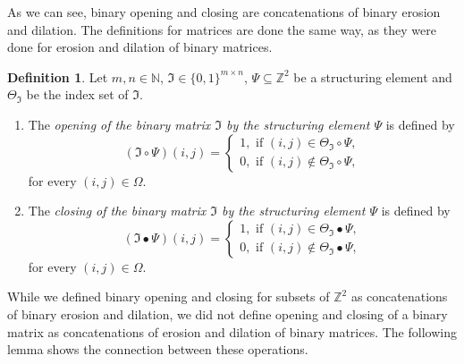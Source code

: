 \documentclass[a4paper,12pt]{article}
\theoremstyle{plain}
\theoremstyle{definition}
\newtheorem{definition}[theorem]{Definition}
\begin{document}
As we can see, binary opening and closing are concatenations of binary erosion and dilation. The definitions for matrices are done the same way, as they were done for erosion and dilation of binary matrices.

\begin{definition}
	Let $m, n \in \mathbb{N}$, $\mathfrak{I} \in \{ 0, 1 \}^{m \times n}$, $\Psi \subseteq \mathbb{Z}^2$ be a structuring element and $\Theta_\mathfrak{I}$ be the index set of $\mathfrak{I}$.
	\begin{enumerate}
		\item The \emph{opening of the binary matrix $\mathfrak{I}$ by the structuring element $\Psi$} is defined by
		\begin{equation}
			(\mathfrak{I} \circ \Psi)(i, j) =
			\begin{cases}
				1, \textrm{ if } (i, j) \in \Theta_\mathfrak{I} \circ \Psi, \\
				0, \textrm{ if } (i, j) \notin \Theta_\mathfrak{I} \circ \Psi,
			\end{cases}
		\end{equation}
		for every $(i, j) \in \Omega$.
		\item The \emph{closing of the binary matrix $\mathfrak{I}$ by the structuring element $\Psi$} is defined by
		\begin{equation}
			(\mathfrak{I} \bullet \Psi)(i, j) =
			\begin{cases}
				1, \textrm{ if } (i, j) \in \Theta_\mathfrak{I} \bullet \Psi, \\
				0, \textrm{ if } (i, j) \notin \Theta_\mathfrak{I} \bullet \Psi,
			\end{cases}
		\end{equation}
		for every $(i, j) \in \Omega$.
	\end{enumerate}
\end{definition}

While we defined binary opening and closing for subsets of $\mathbb{Z}^2$ as concatenations of binary erosion and dilation, we did not define opening and closing of a binary matrix as concatenations of erosion and dilation of binary matrices. The following lemma shows the connection between these operations.
\end{document}
